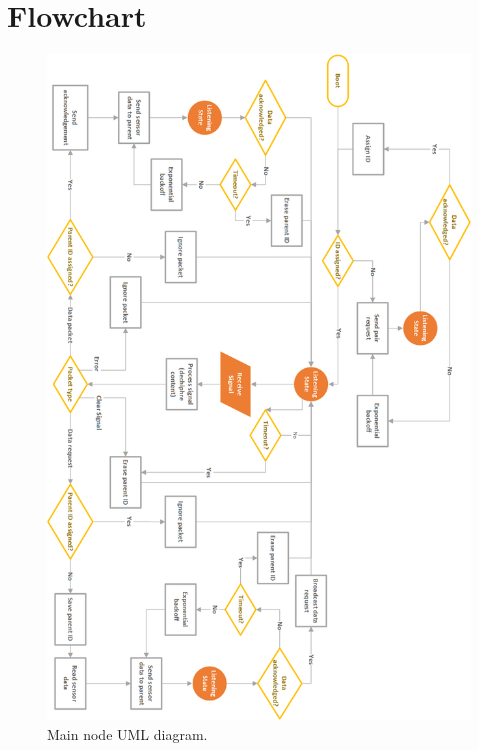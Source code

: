 \chapter{Flowchart} \label{cha:flowchart}
\addtolength{\topmargin}{-.875in}
\begin{figure}[h!]
\centering
\includegraphics[width=1.1\textwidth]{chapters/appendix/flowchart.png}
\caption{Main node UML diagram.}
\label{fig:mainuml}
\end{figure}
\clearpage
\addtolength{\topmargin}{.875in} %
\addtolength{\topmargin}{.875in} %